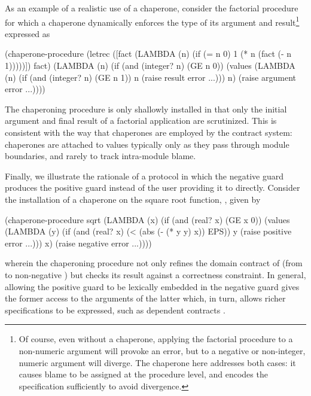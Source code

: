 \documentclass{sigplanconf}
\begin{document}
As an example of a realistic use of a chaperone, consider the factorial procedure for which a chaperone dynamically enforces the type of its argument and result\footnote{Of course, even without a chaperone, applying the factorial procedure to a non-numeric argument will provoke an error, but to a negative or non-integer, numeric argument will diverge. The chaperone here addresses both cases: it causes blame to be assigned at the procedure level, and encodes the specification sufficiently to avoid divergence.} expressed as
\begin{schemedisplay}
(chaperone-procedure
 (letrec ([fact (LAMBDA (n)
                  (if (= n 0)
                      1
                      (* n (fact (- n 1)))))])
   fact)
 (LAMBDA (n)
   (if (and (integer? n) (GE n 0))
       (values (LAMBDA (n)
                 (if (and (integer? n) (GE n 1))
                     n
                     (raise result error ...)))
               n)
       (raise argument error ...))))
\end{schemedisplay}
The chaperoning procedure is only shallowly installed in that only the initial argument and final result of a factorial application are scrutinized.
This is consistent with the way that chaperones are employed by the contract system: chaperones are attached to values typically only as they pass through module boundaries, and rarely to track intra-module blame.

Finally, we illustrate the rationale of a protocol in which the negative guard produces the positive guard instead of the user providing it to  directly.
Consider the installation of a chaperone on the square root function, , given by
\begin{schemedisplay}
(chaperone-procedure
 sqrt
 (LAMBDA (x)
   (if (and (real? x) (GE x 0))
       (values (LAMBDA (y)
                 (if (and (real? x) (< (abs (- (* y y) x)) EPS))
                     y
                     (raise positive error ...)))
               x)
       (raise negative error ...))))
\end{schemedisplay}
wherein the chaperoning procedure not only refines the domain contract of  (from  to non-negative ) but checks its result against a correctness constraint.
In general, allowing the positive guard to be lexically embedded in the negative guard gives the former access to the arguments of the latter which, in turn, allows richer specifications to be expressed, such as dependent contracts \cite{findler2002contracts}.
\end{document}
